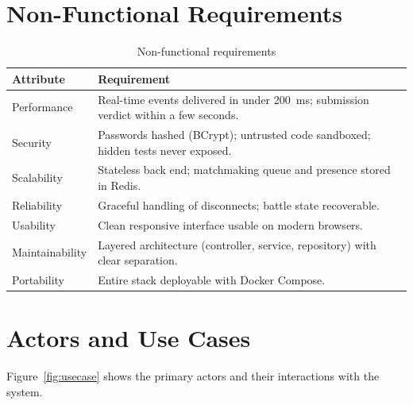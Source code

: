 \documentclass[12pt,a4paper,oneside]{report}
\begin{document}
\section{Non-Functional Requirements}
\begin{table}[H]
\centering
\small
\begin{tabularx}{\textwidth}{@{}lX@{}}
\toprule
\textbf{Attribute} & \textbf{Requirement} \\
\midrule
Performance   & Real-time events delivered in under 200~ms; submission verdict within a few seconds. \\
Security      & Passwords hashed (BCrypt); untrusted code sandboxed; hidden tests never exposed. \\
Scalability   & Stateless back end; matchmaking queue and presence stored in Redis. \\
Reliability   & Graceful handling of disconnects; battle state recoverable. \\
Usability     & Clean responsive interface usable on modern browsers. \\
Maintainability & Layered architecture (controller, service, repository) with clear separation. \\
Portability   & Entire stack deployable with Docker Compose. \\
\bottomrule
\end{tabularx}
\caption{Non-functional requirements}
\end{table}

\section{Actors and Use Cases}
Figure~\ref{fig:usecase} shows the primary actors and their interactions with the system.
\end{document}
